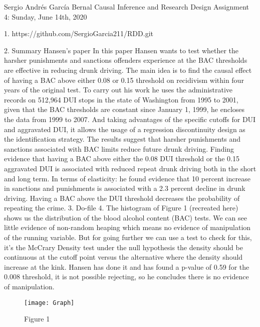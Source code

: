 \documentclass{book}
\begin{document}
Sergio Andrés García Bernal \hspace{1}
Causal Inference and Research Design \hspace{1}
Assignment 4: Sunday, June 14th, 2020


1.	
https://github.com/SergioGarcia211/RDD.git

2.	Summary Hansen’s paper
In this paper Hansen wants to test whether the harsher punishments and sanctions offenders experience at the BAC thresholds are effective in reducing drunk driving. The main idea is to find the causal effect of having a BAC above either 0.08 or 0.15 threshold on recidivism within four years of the original test. To carry out his work he uses the administrative records on 512,964 DUI stops in the state of Washington from 1995 to 2001, given that the BAC thresholds are constant since January 1, 1999, he encloses the data from 1999 to 2007. And taking advantages of the specific cutoffs for DUI and aggravated DUI, it allows the usage of a regression discontinuity design as the identification strategy.
The results suggest that harsher punishments and sanctions associated with BAC limits reduce future drunk driving. Finding evidence that having a BAC above either the 0.08 DUI threshold or the 0.15 aggravated DUI is associated with reduced repeat drunk driving both in the short and long term. In terms of elasticity: he found evidence that 10 percent increase in sanctions and punishments is associated with a 2.3 percent decline in drunk driving. Having a BAC above the DUI threshold decreases the probability of repeating the crime. 
3.	Do-file
4.	
The histogram of Figure 1 (recreated here) shows us the distribution of the blood alcohol content (BAC) tests. We can see little evidence of non-random heaping which means no evidence of manipulation of the running variable. But for going further we can use a test to check for this, it’s the McCrary Density test under the null hypothesis the density should be continuous at the cutoff point versus the alternative where the density should increase at the kink. Hansen has done it and has found a p-value of 0.59 for the 0.008 threshold, it is not possible rejecting, so he concludes there is no evidence of manipulation.


\begin{figure}
  \centering
    \texttt{[image: Graph]}
  \caption{Figure 1}

\end{figure}
\end{document}
